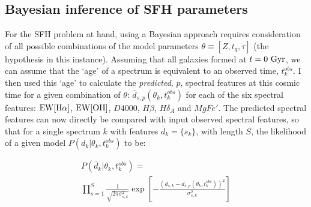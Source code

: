 \documentclass[useAMS,usenatbib]{mn2e}
\begin{document}
\subsection{Bayesian inference of SFH parameters}\label{sec:emcee}

For the SFH problem at hand, using a Bayesian approach requires consideration of all possible combinations of the model parameters $\theta \equiv [Z, t_{q}, \tau]$ (the hypothesis in this instance). Assuming that all galaxies formed at $t=0~\rm{Gyr}$, we can assume that the `age' of a spectrum is equivalent to an observed time, $t^{obs}_{k}$. I then used this  `age' to calculate the \emph{predicted}, $p$, spectral features at this cosmic time for a given combination of $\theta$: $\overline{d}_{s,p}(\theta_k, t^{obs}_{k})$ for each of the six spectral features: $\rm{EW}[H\alpha]$, $\rm{EW}[OII]$, $D4000$, $H\beta$, $H\delta_A$ and $MgFe'$. The predicted spectral features can now directly be compared with input observed spectral features, so that for a single spectrum $k$ with features $\overline{d}_{k} = \{s_k\}$, with length $S$, the likelihood of a given model $P(d_{k}|\theta_k, t^{obs}_{k})$ to be:



\begin{multline}\label{like}
P(\overline{d}_{k}|\theta_k, t^{obs}_{k}) = \\ \prod_{s=1}^{S} \frac{1}{\sqrt{2\pi\sigma_{s, k}^2}} \exp{\left[ - \frac{(d_{s, k} - d_{s, p}(\theta_k, t_{k}^{obs}))^2}{\sigma_{s, k}^2} \right]}
\end{multline}
\end{document}
